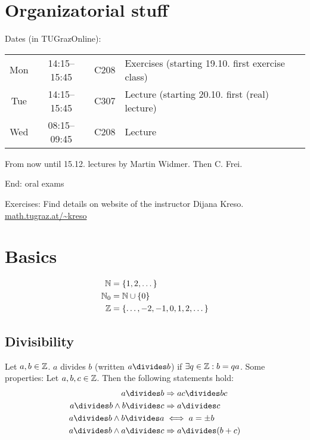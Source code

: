 \documentclass[NumTh.tex]{subfiles}
\begin{document}
\section*{Organizatorial stuff}

Dates (in TUGrazOnline):
\begin{table}[!h]
  \begin{tabular}{cccl}
    Mon & 14:15--15:45 & C208 & Exercises (starting 19.10. first exercise class) \\
    Tue & 14:15--15:45 & C307 & Lecture (starting 20.10. first (real) lecture) \\
    Wed & 08:15--09:45 & C208 & Lecture
  \end{tabular}
\end{table}

From now until 15.12. lectures by Martin Widmer.
Then C. Frei.

End: oral exams

Exercises: Find details on website of the instructor Dijana Kreso.
\url{math.tugraz.at/~kreso}

\section{Basics}

\begin{align}
  \mathbb{N} &= \{1,2,\dots\} \\
  \mathbb{N}_0 &= \mathbb{N} \cup \{0\}\\
  \mathbb{Z} &= \{ \dots,-2,-1,0,1,2,\dots\}
\end{align}

\subsection{Divisibility}
\begin{defi}
Let $a,b \in \mathbb{Z}$. $a$ divides $b$ (written $a\divides b$) if $\exists q \in \mathbb{Z} : b = qa$.
\newline
Some properties: Let $a,b,c \in \mathbb{Z}$. Then the following statements hold:
\begin{align}
  a\divides b &\Rightarrow ac\divides bc \\
  a\divides b \land b\divides c &\Rightarrow a\divides c \\
  a\divides b \land b\divides a &\iff a = \pm b \\
  a\divides b \land a\divides c &\Rightarrow a\divides (b+c)
\end{align}
\end{defi}
\end{document}
